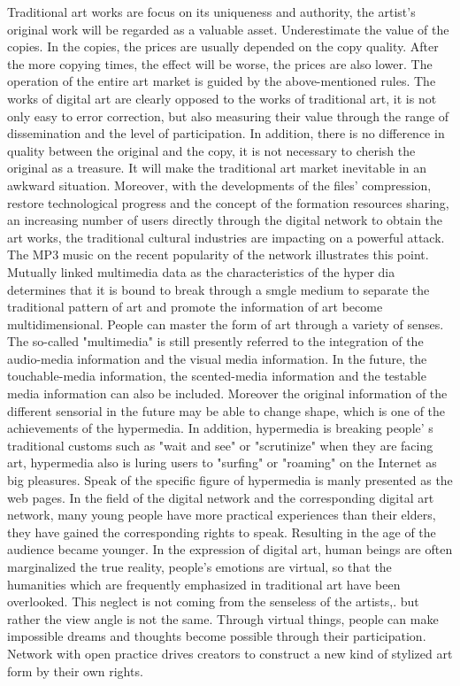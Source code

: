 Traditional art works are focus on its uniqueness and authority, the artist's original work will be regarded as a valuable asset. Underestimate the value of the copies. In the copies, the prices are usually depended on the copy quality. After the more copying times, the effect will be worse, the prices are also lower. The operation of the entire art market is guided by the above-mentioned rules. The works of digital art are clearly opposed to the works of traditional art, it is not only easy to error correction, but also measuring their value through the range of dissemination and the level of participation. In addition, there is no difference in quality
between the original and the copy, it is not necessary to cherish the original as a treasure. It will make the traditional art market inevitable in an awkward situation. Moreover, with the developments of the files' compression, restore technological progress and the concept of the formation resources sharing, an increasing number of users directly through the digital network to obtain the art works, the traditional cultural industries are impacting on a powerful attack. The MP3 music on the recent popularity of the network illustrates this point.\\
Mutually linked multimedia data as the characteristics of the hyper dia determines that it is bound to break through a smgle medium to separate the traditional pattern of art and promote the information of art become multidimensional. People can master the form of art through a variety of senses. The so-called "multimedia" is still presently referred to the integration of the audio-media information and the visual media information. In the future, the touchable-media information, the scented-media information and the testable media information can also be included. Moreover the original information of the different sensorial in the future may be able to change shape, which is one of the achievements of the hypermedia. In addition, hypermedia is breaking people' s traditional customs such as "wait and see" or "scrutinize" when they are facing art, hypermedia also is luring users to "surfing" or "roaming" on the Internet as big pleasures. Speak of the specific figure of hypermedia is manly presented as the web pages.  In the field of the digital network and the corresponding digital art network, many young people have more practical experiences than their elders, they have gained the corresponding rights to speak. Resulting in the age of the audience became younger. In the expression of digital art, human beings are often marginalized the true reality, people's emotions are virtual, so that the humanities which are frequently emphasized in traditional art have been overlooked. This neglect is not coming from the senseless of the artists,. but rather the view angle is not the same. Through virtual things, people can make impossible dreams and thoughts become possible through their participation. Network with open practice drives creators to construct a new kind of stylized art form by their own rights.

